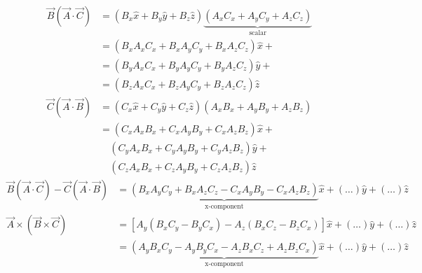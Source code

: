 \documentclass[12pt]{article}
\begin{document}
\begin{align*}
	\vec{B} (\vec{A} \cdot \vec{C}) & = (B_x \hat{x} + B_y \hat{y} + B_z \hat{z}) \underbrace{(A_x C_x + A_y C_y + A_z C_z)}_{\text{scalar}} \\
	                                & = (B_x A_x C_x + B_x A_y C_y + B_x A_z C_z )\hat{x} +                                                  \\
	                                & = (B_y A_x C_x + B_y A_y C_y + B_y A_z C_z )\hat{y} +                                                  \\
	                                & = (B_z A_x C_x + B_z A_y C_y + B_z A_z C_z )\hat{z}                                                    
\end{align*}
\begin{align*}
	\vec{C} (\vec{A} \cdot \vec{B}) & = (C_x \hat{x} + C_y \hat{y} + C_z \hat{z}) (A_x B_x + A_y B_y + A_z B_z) \\
	                                & = (C_x A_x B_x + C_x A_y B_y + C_x A_z B_z )\hat{x} +                     \\
	                                & \quad (C_y A_x B_x + C_y A_y B_y + C_y A_z B_z )\hat{y} +                 \\
	                                & \quad (C_z A_x B_x + C_z A_y B_y + C_z A_z B_z )\hat{z}                   
\end{align*}
\begin{align*}
    \vec{B} (\vec{A} \cdot \vec{C}) - \vec{C} (\vec{A} \cdot \vec{B}) & = \underbrace{(B_x A_y C_y + B_x A_z C_z - C_x A_y B_y - C_x A_z B_z)}_{\text{x-component}}\hat{x} + (\dots) \hat{y} + (\dots) \hat{z}\\
    \vec{A} \times (\vec{B} \times \vec{C})                            & =[A_y(B_x C_y - B_y C_x) - A_z(B_x C_z - B_z C_x)]\hat{x} + (\dots) \hat{y} + (\dots) \hat{z}\\
    &= \underbrace{(A_y B_x C_y - A_y B_y C_x - A_z B_x C_z + A_z B_z C_x)}_{\text{x-component}}\hat{x} + (\dots) \hat{y} + (\dots) \hat{z}                                                                                                                                
\end{align*}
\end{document}
